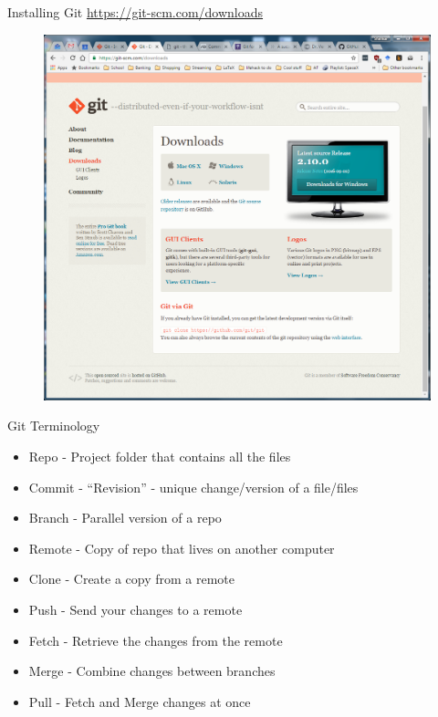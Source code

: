 \documentclass[11pt,professionalfonts]{beamer}
\begin{document}
\begin{frame}{Installing Git}%
    \url{https://git-scm.com/downloads}

    \begin{figure}
        \centering
        \includegraphics[width=0.8\textheight]{figures/download.png}
    \end{figure}
\end{frame}%

\begin{frame}{Git Terminology}%
\begin{itemize}
    \item Repo - Project folder that contains all the files
    \item Commit - ``Revision'' - unique change/version of a file/files
    \item Branch - Parallel version of a repo
    \item Remote - Copy of repo that lives on another computer
    \item Clone - Create a copy from a remote
    \item Push - Send your changes to a remote
    \item Fetch - Retrieve the changes from the remote
    \item Merge - Combine changes between branches
    \item Pull - Fetch and Merge changes at once
\end{itemize}
\end{frame}%
\end{document}
